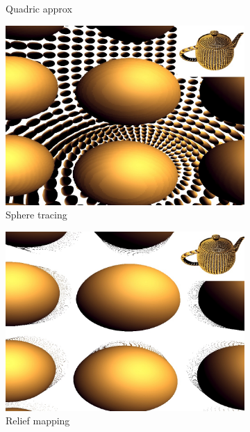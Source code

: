 \begin{figure}
\begin{center}
\begin{subfigure}[b]{0.1758\textwidth}
		\caption{Quadric approx}
	\end{subfigure}
	\begin{subfigure}[b]{0.202\textwidth}
		\includegraphics[width=1.0\textwidth]{graphics/df/ddm-sphere-tracing-1}	
		\caption{Sphere tracing}
	\end{subfigure}
	\begin{subfigure}[b]{0.202\textwidth}
		\includegraphics[width=1.0\textwidth]{graphics/df/ddm-relief-mapping}
		\caption{Relief mapping}
	\end{subfigure}
	\begin{subfigure}[b]{0.202\textwidth}

\end{subfigure}
\end{center}
\end{figure}

